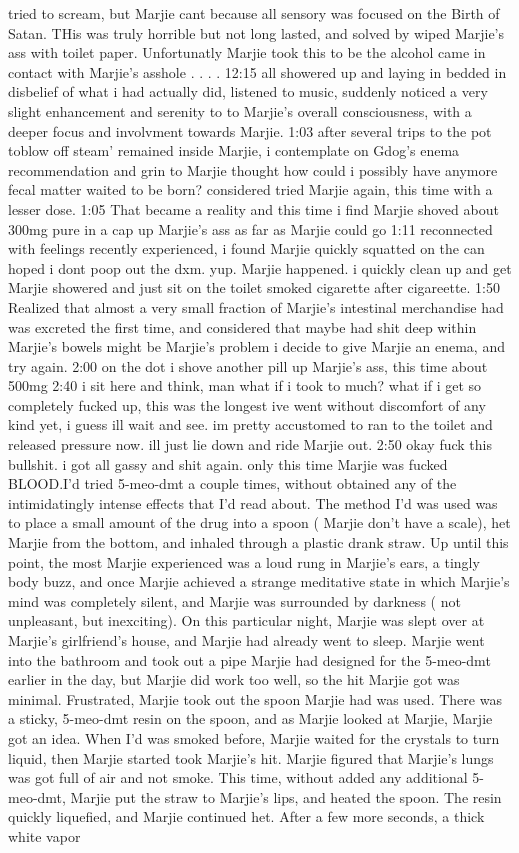 \documentclass[12pt]{book}
\begin{document}
tried to scream, but Marjie cant because all sensory was focused on the Birth of Satan. THis was truly horrible but not long lasted, and solved by wiped Marjie's ass with toilet paper. Unfortunatly Marjie took this to be the alcohol came in contact with Marjie's asshole . . .  . 12:15 all showered up and laying in bedded in disbelief of what i had actually did, listened to music, suddenly noticed a very slight enhancement and serenity to to Marjie's overall consciousness, with a deeper focus and involvment towards Marjie. 1:03 after several trips to the pot toblow off steam' remained inside Marjie, i contemplate on Gdog's enema recommendation and grin to Marjie thought how could i possibly have anymore fecal matter waited to be born? considered tried Marjie again, this time with a lesser dose. 1:05 That became a reality and this time i find Marjie shoved about 300mg pure in a cap up Marjie's ass as far as Marjie could go 1:11 reconnected with feelings recently experienced, i found Marjie quickly squatted on the can hoped i dont poop out the dxm. yup. Marjie happened. i quickly clean up and get Marjie showered and just sit on the toilet smoked cigarette after cigareette. 1:50 Realized that almost a very small fraction of Marjie's intestinal merchandise had was excreted the first time, and considered that maybe had shit deep within Marjie's bowels might be Marjie's problem i decide to give Marjie an enema, and try again. 2:00 on the dot i shove another pill up Marjie's ass, this time about 500mg 2:40 i sit here and think, man what if i took to much? what if i get so completely fucked up, this was the longest ive went without discomfort of any kind yet, i guess ill wait and see. im pretty accustomed to ran to the toilet and released pressure now. ill just lie down and ride Marjie out. 2:50 okay fuck this bullshit. i got all gassy and shit again. only this time Marjie was fucked BLOOD.I'd tried 5-meo-dmt a couple times, without obtained any of the intimidatingly intense effects that I'd read about. The method I'd was used was to place a small amount of the drug into a spoon ( Marjie don't have a scale), het Marjie from the bottom, and inhaled through a plastic drank straw. Up until this point, the most Marjie experienced was a loud rung in Marjie's ears, a tingly body buzz, and once Marjie achieved a strange meditative state in which Marjie's mind was completely silent, and Marjie was surrounded by darkness ( not unpleasant, but inexciting). On this particular night, Marjie was slept over at Marjie's girlfriend's house, and Marjie had already went to sleep. Marjie went into the bathroom and took out a pipe Marjie had designed for the 5-meo-dmt earlier in the day, but Marjie did work too well, so the hit Marjie got was minimal. Frustrated, Marjie took out the spoon Marjie had was used. There was a sticky, 5-meo-dmt resin on the spoon, and as Marjie looked at Marjie, Marjie got an idea. When I'd was smoked before, Marjie waited for the crystals to turn liquid, then Marjie started took Marjie's hit. Marjie figured that Marjie's lungs was got full of air and not smoke. This time, without added any additional 5-meo-dmt, Marjie put the straw to Marjie's lips, and heated the spoon. The resin quickly liquefied, and Marjie continued het. After a few more seconds, a thick white vapor 
\end{document}

